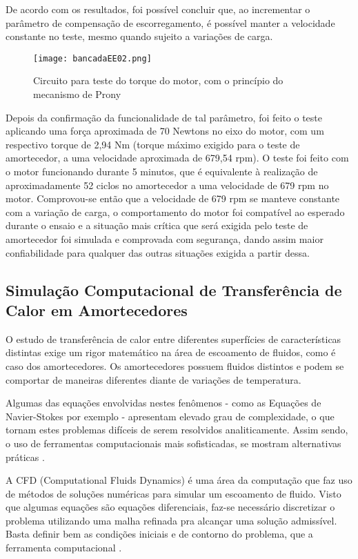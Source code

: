 			De acordo com os resultados, foi possível concluir que, ao incrementar o parâmetro de compensação de escorregamento, é possível manter a velocidade constante no teste, mesmo quando sujeito a variações de carga.

			\newpage
			\begin{figure}[!h]
				\centering
				\texttt{[image: bancadaEE02.png]}
				\caption[Circuito para teste do torque do motor, com o princípio do mecanismo de Prony]{Circuito para teste do torque do motor, com o princípio do mecanismo de Prony} 
				\label{bancadaEE02}
			\end{figure}

			Depois da confirmação da funcionalidade de tal parâmetro, foi feito o teste aplicando uma força aproximada de 70 Newtons no eixo do motor, com um respectivo torque de 2,94 Nm (torque máximo exigido para o teste de amortecedor, a uma velocidade aproximada de 679,54 rpm). O teste foi feito com o motor funcionando durante 5 minutos, que é equivalente à realização de aproximadamente 52 ciclos no amortecedor a uma velocidade de 679 rpm no motor. Comprovou-se então que a velocidade de 679 rpm se manteve constante com a variação de carga, o comportamento do motor foi compatível ao esperado durante o ensaio e a situação mais crítica que será exigida pelo teste de amortecedor foi simulada e comprovada com segurança, dando assim maior confiabilidade para qualquer das outras situações exigida a partir dessa.

\newpage
\subsection{Simulação Computacional de Transferência de Calor em Amortecedores}

	O estudo de transferência de calor entre diferentes superfícies de características distintas exige um rigor matemático na área de escoamento de fluidos, como é caso dos amortecedores. Os amortecedores possuem fluidos distintos e podem se comportar de maneiras diferentes diante de variações de temperatura.
	
	Algumas das equações envolvidas nestes fenômenos - como as Equações de Navier-Stokes por exemplo - apresentam elevado grau de complexidade, o que tornam estes problemas difíceis de serem resolvidos analiticamente. Assim sendo, o uso de ferramentas computacionais mais sofisticadas, se mostram alternativas práticas \cite{Neto}. 
	
	A CFD (Computational Fluids Dynamics) é uma área da computação que faz uso de métodos de soluções numéricas para simular um escoamento de fluido. Visto que algumas equações são equações diferenciais, faz-se necessário discretizar o problema  utilizando uma malha refinada pra alcançar uma solução admissível. Basta definir bem as condições iniciais e de contorno do problema, que a ferramenta computacional \cite{Neto}. 
	
